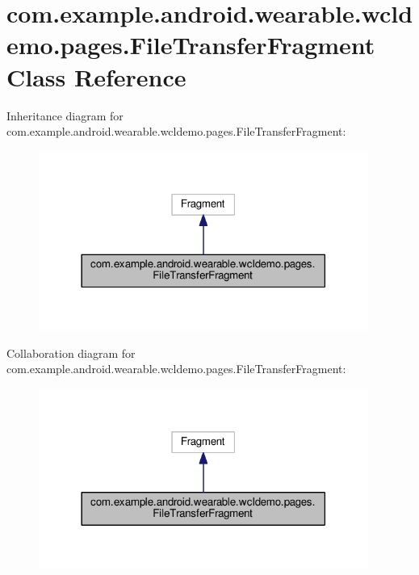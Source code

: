 \hypertarget{classcom_1_1example_1_1android_1_1wearable_1_1wcldemo_1_1pages_1_1FileTransferFragment}{}\section{com.\+example.\+android.\+wearable.\+wcldemo.\+pages.\+File\+Transfer\+Fragment Class Reference}
\label{classcom_1_1example_1_1android_1_1wearable_1_1wcldemo_1_1pages_1_1FileTransferFragment}


Inheritance diagram for com.\+example.\+android.\+wearable.\+wcldemo.\+pages.\+File\+Transfer\+Fragment\+:
\nopagebreak
\begin{figure}[H]
\begin{center}
\leavevmode
\includegraphics[width=306pt]{da/d97/classcom_1_1example_1_1android_1_1wearable_1_1wcldemo_1_1pages_1_1FileTransferFragment__inherit__graph}
\end{center}
\end{figure}


Collaboration diagram for com.\+example.\+android.\+wearable.\+wcldemo.\+pages.\+File\+Transfer\+Fragment\+:
\nopagebreak
\begin{figure}[H]
\begin{center}
\leavevmode
\includegraphics[width=306pt]{d5/d29/classcom_1_1example_1_1android_1_1wearable_1_1wcldemo_1_1pages_1_1FileTransferFragment__coll__graph}
\end{center}
\end{figure}
